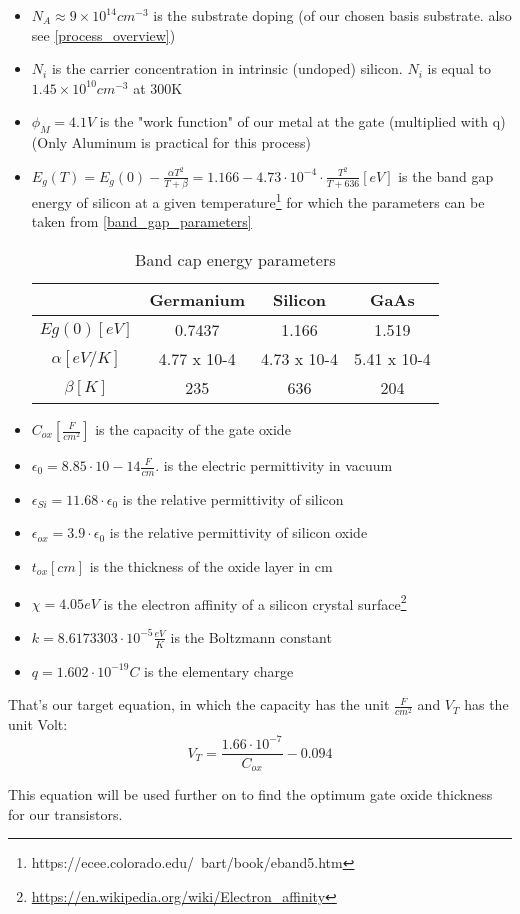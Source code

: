 \begin{itemize}
\item $N_A \approx 9\times10^{14}cm^{-3}$ is the substrate doping (of our chosen basis substrate. also see \autoref{process_overview})
\item $N_i$ is the carrier concentration in intrinsic (undoped) silicon. $N_i$ is equal to $1.45 \times 10^{10} cm^{-3}$ at 300\degree K
\item $\phi_M = 4.1 V$ is the "work function" of our metal at the gate (multiplied with q) (Only Aluminum is practical for this process)
\item $E_g(T) = E_g(0) - \frac{\alpha T^2}{T+\beta} = 1.166 - 4.73 \cdot 10^{-4} \cdot \frac{T^2}{T+636} [eV]$ is the band gap energy of silicon at a given temperature\footnote{https://ecee.colorado.edu/~bart/book/eband5.htm} for which the parameters can be taken from \autoref{band_gap_parameters}
\begin{table}[H]
\centering
\begin{tabular}{|c|c|c|c|}
\hline
{} &
\textbf{Germanium} &
\textbf{Silicon} &
\textbf{GaAs} \\
\hline
$Eg(0) [eV]$ &
0.7437 &
1.166 &
1.519 \\
\hline
$\alpha [eV/K]$ &
4.77 x 10-4 &
4.73 x 10-4 &
5.41 x 10-4 \\
\hline
$\beta [K]$ &
235 &
636 &
204 \\
\hline
\end{tabular}
\caption{Band cap energy parameters}
\label{band_gap_parameters}
\end{table}
\item $C_{ox} \left[\frac{F}{cm^2}\right]$ is the capacity of the gate oxide
\item $\epsilon_0 = 8.85 \cdot 10−14 \frac{F}{cm}. $ is the electric permittivity in vacuum
\item $\epsilon_{Si} =11.68 \cdot \epsilon_0$ is the relative permittivity of silicon
\item $\epsilon_{ox} = 3.9 \cdot \epsilon_0$ is the relative permittivity of silicon oxide
\item $t_{ox} [cm]$ is the thickness of the oxide layer in cm
\item $\chi = 4.05 eV$ is the electron affinity of a silicon crystal surface\footnote{\url{https://en.wikipedia.org/wiki/Electron_affinity}}
\item $k=8.6173303 \cdot 10^{-5} \frac{eV}{K}$ is the Boltzmann constant
\item $q=1.602 \cdot 10^{-19} C$ is the elementary charge
\end{itemize}

That's our target equation, in which the capacity has the unit $\frac{F}{cm^2}$ and $V_T$ has the unit Volt:
\begin{equation}
\boxed{
V_T= \frac{1.66 \cdot 10^{-7}}{C_{ox}}-0.094
}
\end{equation}

This equation will be used further on to find the optimum gate oxide thickness for our transistors.